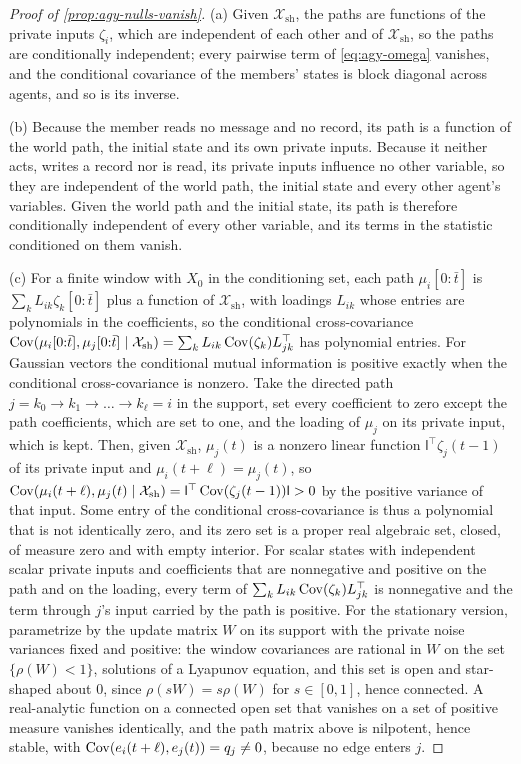 \begin{proof}[Proof of \cref{prop:agy-nulls-vanish}]
(a) Given $\mathcal X_{\mathrm{sh}}$, the paths are functions of the private inputs $\zeta_i$, which are independent of each other and of $\mathcal X_{\mathrm{sh}}$, so the paths are conditionally independent; every pairwise term of \eqref{eq:agy-omega} vanishes, and the conditional covariance of the members' states is block diagonal across agents, and so is its inverse.

(b) Because the member reads no message and no record, its path is a function of the world path, the initial state and its own private inputs. Because it neither acts, writes a record nor is read, its private inputs influence no other variable, so they are independent of the world path, the initial state and every other agent's variables. Given the world path and the initial state, its path is therefore conditionally independent of every other variable, and its terms in the statistic conditioned on them vanish.

(c) For a finite window with $X_0$ in the conditioning set, each path $\mu_i[0{:}\bar t]$ is $\sum_kL_{ik}\zeta_k[0{:}\bar t]$ plus a function of $\mathcal X_{\mathrm{sh}}$, with loadings $L_{ik}$ whose entries are polynomials in the coefficients, so the conditional cross-covariance $\operatorname{Cov}(\mu_i[0{:}\bar t],\mu_j[0{:}\bar t]\mid\mathcal X_{\mathrm{sh}})=\sum_kL_{ik}\operatorname{Cov}(\zeta_k)L_{jk}^\top$ has polynomial entries. For Gaussian vectors the conditional mutual information is positive exactly when the conditional cross-covariance is nonzero. Take the directed path $j=k_0\to k_1\to\dots\to k_\ell=i$ in the support, set every coefficient to zero except the path coefficients, which are set to one, and the loading of $\mu_j$ on its private input, which is kept. Then, given $\mathcal X_{\mathrm{sh}}$, $\mu_j(t)$ is a nonzero linear function $\mathsf l^\top\zeta_j(t-1)$ of its private input and $\mu_i(t+\ell)=\mu_j(t)$, so $\operatorname{Cov}(\mu_i(t+\ell),\mu_j(t)\mid\mathcal X_{\mathrm{sh}})=\mathsf l^\top\operatorname{Cov}(\zeta_j(t-1))\mathsf l>0$ by the positive variance of that input. Some entry of the conditional cross-covariance is thus a polynomial that is not identically zero, and its zero set is a proper real algebraic set, closed, of measure zero and with empty interior. For scalar states with independent scalar private inputs and coefficients that are nonnegative and positive on the path and on the loading, every term of $\sum_kL_{ik}\operatorname{Cov}(\zeta_k)L_{jk}^\top$ is nonnegative and the term through $j$'s input carried by the path is positive. For the stationary version, parametrize by the update matrix $W$ on its support with the private noise variances fixed and positive: the window covariances are rational in $W$ on the set $\{\rho(W)<1\}$, solutions of a Lyapunov equation, and this set is open and star-shaped about $0$, since $\rho(sW)=s\rho(W)$ for $s\in[0,1]$, hence connected. A real-analytic function on a connected open set that vanishes on a set of positive measure vanishes identically, and the path matrix above is nilpotent, hence stable, with $\operatorname{Cov}(e_i(t+\ell),e_j(t))=q_j\ne0$, because no edge enters $j$.


\end{proof}
